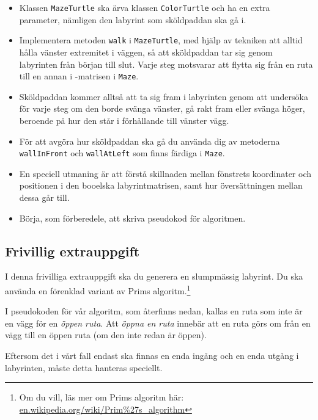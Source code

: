 \begin{itemize}
\item Klassen \texttt{MazeTurtle} ska ärva klassen \texttt{ColorTurtle} och ha en extra parameter, nämligen den labyrint som sköldpaddan ska gå i. 

\item Implementera metoden \texttt{walk} i \texttt{MazeTurtle}, med hjälp av tekniken att alltid hålla vänster extremitet i väggen, så att sköldpaddan tar sig genom labyrinten från början till slut. Varje steg motsvarar att flytta sig från en ruta till en annan i -matrisen i \texttt{Maze}. 

\item Sköldpaddan kommer alltså att ta sig fram i labyrinten genom att undersöka för varje steg om den borde svänga vänster, gå rakt fram eller svänga höger, beroende på hur den står i förhållande till vänster vägg. 

\item För att avgöra hur sköldpaddan ska gå du använda dig av metoderna \texttt{wallInFront} och \texttt{wallAtLeft} som finns färdiga i \texttt{Maze}. 

\item En speciell utmaning är att förstå skillnaden mellan fönstrets koordinater och positionen i den booelska labyrintmatrisen, samt hur översättningen mellan dessa går till.

\item Börja, som förberedele, att skriva pseudokod för algoritmen.

\end{itemize}


\clearpage

\subsection{Frivillig extrauppgift}

I denna frivilliga extrauppgift ska du generera en slumpmässig labyrint. Du ska använda en förenklad variant av Prims algoritm.\footnote{Om du vill, läs mer om Prims algoritm här: \href{https://en.wikipedia.org/wiki/Prim\%27s_algorithm}{en.wikipedia.org/wiki/Prim\%27s\_algorithm}}

I pseudokoden för vår algoritm, som återfinns nedan, kallas en ruta som inte är en vägg för en \emph{öppen ruta}. Att \emph{öppna en ruta} innebär att en ruta görs om från en vägg till en öppen ruta (om den inte redan är öppen). 
 
Eftersom det i vårt fall endast ska finnas en enda ingång och en enda utgång i labyrinten, måste detta hanteras speciellt.

